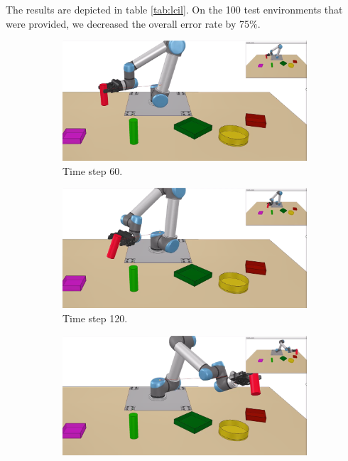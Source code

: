 The results are depicted in table \ref{tab:lcil}. On the 100 test environments that were provided, we decreased the overall error rate by 75$ \% $. 
\begin{figure}
    \captionsetup[subfigure]{justification=Centering, labelformat=empty}
    \begin{subfigure}[t]{0.18\textwidth}
        \includegraphics[width=\textwidth]{images/Language_Conditioned_Exp/theirs_1.png}
        \caption{Time step 60.}
    \end{subfigure}
    \begin{subfigure}[t]{0.18\textwidth}
        \includegraphics[width=\linewidth]{images/Language_Conditioned_Exp/theirs_2.png}
        \caption{Time step 120.}
    \end{subfigure}
    \begin{subfigure}[t]{0.18\textwidth}
        \includegraphics[width=\linewidth]{images/Language_Conditioned_Exp/theirs_3.png}

\end{subfigure}
\end{figure}
